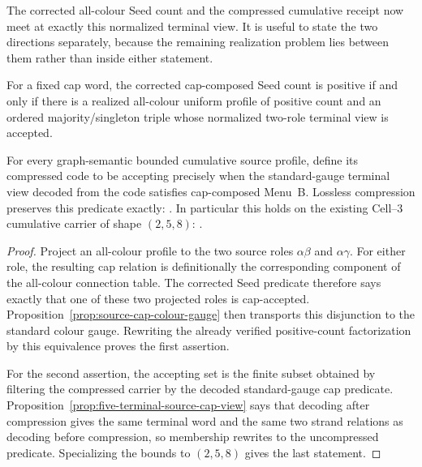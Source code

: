 The corrected all-colour Seed count and the compressed cumulative receipt now
meet at exactly this normalized terminal view.  It is useful to state the two
directions separately, because the remaining realization problem lies between
them rather than inside either statement.

\begin{proposition}
\label{prop:source-seed-compressed-acceptance}
For a fixed cap word, the corrected cap-composed Seed count is positive if and
only if there is a realized all-colour uniform profile of positive count and an
ordered majority/singleton triple whose normalized two-role terminal view is
accepted.

For every graph-semantic bounded cumulative source profile, define its
compressed code to be accepting precisely when the standard-gauge terminal
view decoded from the code satisfies cap-composed Menu~B.  Lossless compression
preserves this predicate exactly:
.
In particular this holds on the existing Cell--3 cumulative carrier of shape
$(2,5,8)$:
.
\end{proposition}

\begin{proof}
Project an all-colour profile to the two source roles
$\alpha\beta$ and $\alpha\gamma$.  For either role, the resulting cap relation
is definitionally the corresponding component of the all-colour connection
table.  The corrected Seed predicate therefore says exactly that one of these
two projected roles is cap-accepted.  Proposition~\ref{prop:source-cap-colour-gauge}
then transports this disjunction to the standard colour gauge.  Rewriting the
already verified positive-count factorization by this equivalence proves the
first assertion.

For the second assertion, the accepting set is the finite subset obtained by
filtering the compressed carrier by the decoded standard-gauge cap predicate.
Proposition~\ref{prop:five-terminal-source-cap-view} says that decoding after
compression gives the same terminal word and the same two strand relations as
decoding before compression, so membership rewrites to the uncompressed
predicate.  Specializing the bounds to $(2,5,8)$ gives the last statement.
\end{proof}

